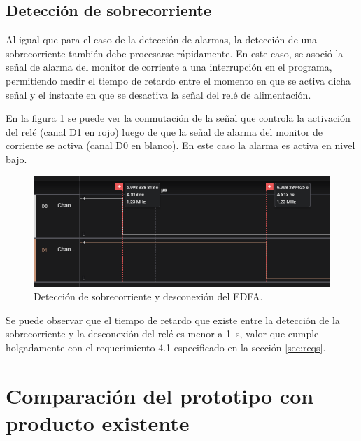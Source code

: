 \subsection{Detección de sobrecorriente}

Al igual que para el caso de la detección de alarmas, la detección de una sobrecorriente también debe procesarse rápidamente. En este caso, se asoció la señal de alarma del monitor de corriente a una interrupción en el programa, permitiendo medir el tiempo de retardo entre el momento en que se activa dicha señal y el instante en que se desactiva la señal del relé de alimentación.

En la figura \ref{fig:detecOC} se puede ver la conmutación de la señal que controla la activación del relé (canal D1 en rojo) luego de que la señal de alarma del monitor de corriente se activa (canal D0 en blanco). En este caso la alarma es activa en nivel bajo.

\begin{figure}[H]
\centering
\includegraphics[width=1\textwidth]{./Figures/detecOC.png}
\caption{Detección de sobrecorriente y desconexión del EDFA.}
\label{fig:detecOC}
\end{figure}

Se puede observar que el tiempo de retardo que existe entre la detección de la sobrecorriente y la desconexión del relé es menor a 1~\textmu s, valor que cumple holgadamente con el requerimiento 4.1 especificado en la sección \ref{sec:reqs}.

\section{Comparación del prototipo con producto existente}

